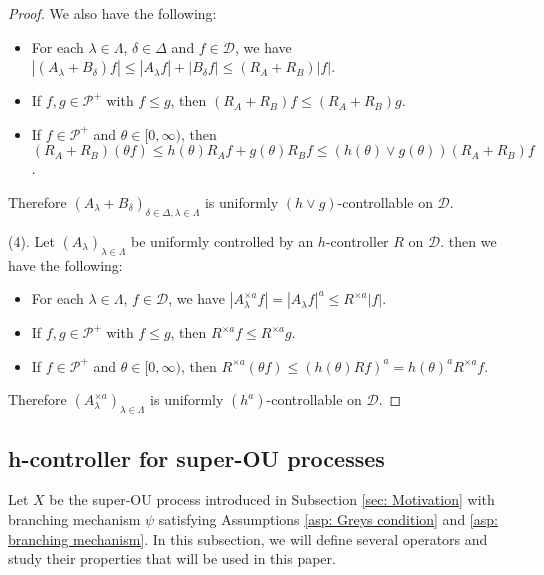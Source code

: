 \documentclass[12pt,a4paper]{amsart}
\theoremstyle{plain}
\theoremstyle{definition}
\numberwithin{equation}{section}
\begin{document}
\begin{proof}
    We also have the following:
\begin{itemize}
\item
    For each $\lambda \in \Lambda$, $\delta \in \Delta$ and $f\in \mathcal D$, we have $|(A_\lambda + B_\delta) f| \leq |A_\lambda f| + |B_\delta f| \leq (R_A + R_B) |f|$.
\item
        If $f,g \in \mathcal P^+$ with $f\leq g$, then $(R_A + R_B)f \leq (R_A + R_B) g$.
\item
        If $f \in \mathcal P^+$ and $\theta \in [0,\infty)$, then $(R_A + R_B) (\theta f) \leq h(\theta) R_Af + g(\theta) R_Bf \leq (h(\theta) \vee g(\theta)) (R_A+R_B)f $.
\end{itemize}
    Therefore $(A_\lambda + B_\delta)_{\delta\in \Delta, \lambda \in \Lambda}$ is uniformly $(h \vee g)$-controllable on $\mathcal D$.

    (4). Let $(A_\lambda)_{\lambda\in\Lambda}$ be uniformly controlled by an $h$-controller $R$ on $\mathcal D$.
    then we have the following:
\begin{itemize}
\item
    For each $\lambda \in \Lambda$, $f\in \mathcal D$, we have $|A_\lambda^{\times a} f| = |A_\lambda f|^a  \leq R^{\times a} |f|$.
\item
        If $f,g \in \mathcal P^+$ with $f\leq g$, then $R^{\times a}f \leq R^{\times a} g$.
\item
        If $f \in \mathcal P^+$ and $\theta \in [0,\infty)$, then $R^{\times a}(\theta f) \leq (h(\theta) R f)^a = h(\theta)^a R^{\times a}f$.
\end{itemize}
    Therefore $(A_\lambda^{\times a})_{\lambda \in \Lambda}$ is uniformly $(h^a)$-controllable on $\mathcal D$.
\end{proof}

\subsection{h-controller  for super-OU processes}
\label{sec: h-controller}
   Let $X$ be the super-OU process introduced in Subsection \ref{sec: Motivation}
    with branching mechanism $\psi$ satisfying 
    Assumptions \ref{asp: Greys condition} and \ref{asp: branching mechanism}.
	In this subsection, we will define several operators and study their properties that will be used in this paper.
\end{document}
